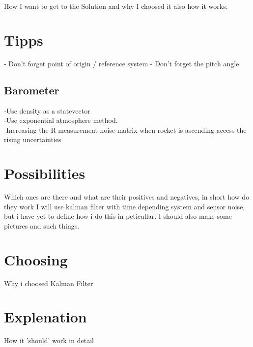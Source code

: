 
  How I want to get to the Solution and why I choosed it also how it works.
  
  \section{Tipps}
  - Don't forget point of origin / reference system
  - Don't forget the pitch angle
 
  
  \subsection{Barometer}
  -Use density as a statevector \\
  -Use exponential atmosphere method. \\
  -Increasing the R measurement noise matrix when rocket is ascending access the rising uncertainties
  
  
  \section{Possibilities}
  Which ones are there and what are their positives and negatives, in short how do they work
  I will use kalman filter with time depending system and sensor noise, but i have yet to define how i do this in peticullar.
  I should also make some pictures and such things.
  
  \section{Choosing}
  Why i choosed Kalman Filter
  
  \section{Explenation}
  How it 'should' work in detail
  
